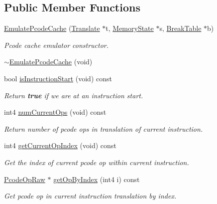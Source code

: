 \subsection*{Public Member Functions}
\begin{DoxyCompactItemize}
\item 
\mbox{\hyperlink{class_emulate_pcode_cache_a1efa63681c9911be126f6dd38a2fb4f6}{Emulate\+Pcode\+Cache}} (\mbox{\hyperlink{class_translate}{Translate}} $\ast$t, \mbox{\hyperlink{class_memory_state}{Memory\+State}} $\ast$s, \mbox{\hyperlink{class_break_table}{Break\+Table}} $\ast$b)
\begin{DoxyCompactList}\small\item\em Pcode cache emulator constructor. \end{DoxyCompactList}\item 
\mbox{\hyperlink{class_emulate_pcode_cache_a5729f300720a96149efc3d79573e4162}{$\sim$\+Emulate\+Pcode\+Cache}} (void)
\item 
bool \mbox{\hyperlink{class_emulate_pcode_cache_a2181035b11cf4b7df9e67c95aaedbed6}{is\+Instruction\+Start}} (void) const
\begin{DoxyCompactList}\small\item\em Return {\bfseries{true}} if we are at an instruction start. \end{DoxyCompactList}\item 
int4 \mbox{\hyperlink{class_emulate_pcode_cache_a8f19e816af73f36a2d2c6633aba71711}{num\+Current\+Ops}} (void) const
\begin{DoxyCompactList}\small\item\em Return number of pcode ops in translation of current instruction. \end{DoxyCompactList}\item 
int4 \mbox{\hyperlink{class_emulate_pcode_cache_a733683ca5bfdae3d607cf10c8db341e6}{get\+Current\+Op\+Index}} (void) const
\begin{DoxyCompactList}\small\item\em Get the index of current pcode op within current instruction. \end{DoxyCompactList}\item 
\mbox{\hyperlink{class_pcode_op_raw}{Pcode\+Op\+Raw}} $\ast$ \mbox{\hyperlink{class_emulate_pcode_cache_ae96cdbb6e6128965335fb7cddb20500b}{get\+Op\+By\+Index}} (int4 i) const
\begin{DoxyCompactList}\small\item\em Get pcode op in current instruction translation by index. \end{DoxyCompactList}\item 

\end{DoxyCompactItemize}
